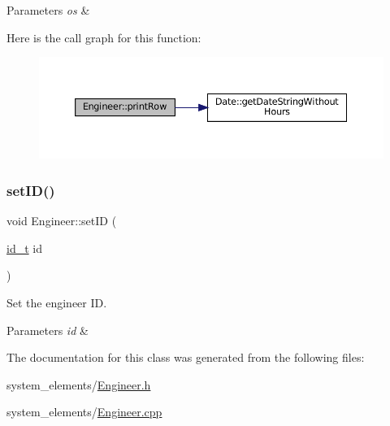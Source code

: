 \begin{DoxyParams}{Parameters}
{\em os} & \\
\hline
\end{DoxyParams}
Here is the call graph for this function\+:
\nopagebreak
\begin{figure}[H]
\begin{center}
\leavevmode
\includegraphics[width=350pt]{classEngineer_a75fdfc733d86cb8dc2ff243994716da1_cgraph}
\end{center}
\end{figure}
\mbox{\label{classEngineer_ad413cf55ffbef71b3d5d58aa522da8cf}} 
\subsubsection{\texorpdfstring{set\+I\+D()}{setID()}}
{\footnotesize\ttfamily void Engineer\+::set\+ID (\begin{DoxyParamCaption}\item[{\mbox{\hyperlink{project__utils_8h_a8f3a969054ad2200720b96e7e23dd4e1}{id\+\_\+t}}}]{id }\end{DoxyParamCaption})}

Set the engineer ID.


\begin{DoxyParams}{Parameters}
{\em id} & \\
\hline
\end{DoxyParams}


The documentation for this class was generated from the following files\+:\begin{DoxyCompactItemize}
\item 
system\+\_\+elements/\mbox{\hyperlink{Engineer_8h}{Engineer.\+h}}\item 
system\+\_\+elements/\mbox{\hyperlink{Engineer_8cpp}{Engineer.\+cpp}}\end{DoxyCompactItemize}
